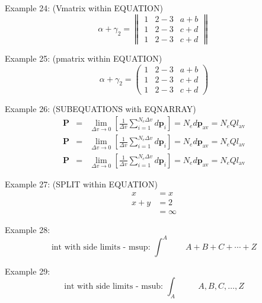\documentclass{book}
\begin{document}
\noindent Example 24: (Vmatrix within EQUATION)
\begin{equation*}
	\alpha + \gamma_{2} = \begin{Vmatrix}
		1 & 2-3 & a+b \\
		1 & 2-3 & c+d \\
		1 & 2-3 & c+d
	\end{Vmatrix}
\end{equation*}

\noindent Example 25: (pmatrix within EQUATION)
\begin{equation*}
	\alpha + \gamma_{2} = \begin{pmatrix}
		1 & 2-3 & a+b \\
		1 & 2-3 & c+d \\
		1 & 2-3 & c+d
	\end{pmatrix}
\end{equation*}

\noindent Example 26: (SUBEQUATIONS with EQNARRAY)
\begin{subequations}
	\begin{eqnarray}
		\mathbf{P} &= &\lim_{\Delta v\to 0} \left[\frac{1}{\Delta v}\sum_{i=1}^{N_{e}\Delta v}d\mathbf{p}_{i}\right] = N_{e}d\mathbf{p}_{\mathrm{av}} = N_{e}Q{l}_{\mathrm{av}} \nonumber \\
		\mathbf{P} &= &\lim_{\Delta v\to 0} \left[\frac{1}{\Delta v}\sum_{i=1}^{N_{e}\Delta v}d\mathbf{p}_{i}\right] = N_{e}d\mathbf{p}_{\mathrm{av}} = N_{e}Q{l}_{\mathrm{av}} \\
		\mathbf{P} &= &\lim_{\Delta v\to 0} \left[\frac{1}{\Delta v}\sum_{i=1}^{N_{e}\Delta v}d\mathbf{p}_{i}\right] = N_{e}d\mathbf{p}_{\mathrm{av}} = N_{e}Q{l}_{\mathrm{av}}
	\end{eqnarray}
\end{subequations}

\noindent Example 27: (SPLIT within EQUATION)
\begin{equation}
	\begin{split}
		x     & = x      \\
		x + y & =2       \\
		      & = \infty
	\end{split}
\end{equation}

\noindent Example 28:
\[
	\mbox{int with side limits - msup: } \int^{A}\qquad A + B + C + \cdots + Z
\]

\noindent Example 29:
\[\mbox{int with side limits - msub: } \int_{A}\qquad A, B, C, \ldots, Z \]
\end{document}
